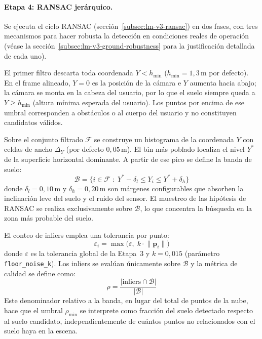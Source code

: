 \paragraph{Etapa 4: RANSAC jerárquico.}
Se ejecuta el ciclo RANSAC (sección~\ref{subsec:lm-v3-ransac}) en dos fases,
con tres mecanismos para hacer robusta la detección en condiciones reales de
operación (véase la sección~\ref{subsec:lm-v3-ground-robustness} para la
justificación detallada de cada uno).

El primer filtro descarta toda coordenada $Y < h_{\min}$ ($h_{\min} = 1{,}3\,\text{m}$
por defecto). En el frame alineado, $Y = 0$ es la posición de la cámara e $Y$
aumenta hacia abajo; la cámara se monta en la cabeza del usuario, por lo que
el suelo siempre queda a $Y \geq h_{\min}$ (altura mínima esperada del
usuario). Los puntos por encima de ese umbral corresponden a obstáculos o al
cuerpo del usuario y no constituyen candidatos válidos.

Sobre el conjunto filtrado $\mathcal{F}$ se construye un histograma de la coordenada
$Y$ con celdas de ancho $\Delta_Y$ (por defecto $0{,}05\,\text{m}$). El bin
más poblado localiza el nivel $Y^*$ de la superficie horizontal dominante.
A partir de ese pico se define la banda de suelo:
\begin{equation}
  \label{eq:floor-band}
  \mathcal{B} = \bigl\{i \in \mathcal{F} \;:\; Y^* - \delta_l \leq Y_i \leq Y^* + \delta_h\bigr\}
\end{equation}
donde $\delta_l = 0{,}10\,\text{m}$ y $\delta_h = 0{,}20\,\text{m}$ son márgenes
configurables que absorben la inclinación leve del suelo y el ruido del sensor.
El muestreo de las hipótesis de RANSAC se realiza exclusivamente sobre $\mathcal{B}$,
lo que concentra la búsqueda en la zona más probable del suelo.

El conteo de inliers emplea una tolerancia por punto:
\begin{equation}
  \label{eq:variable-tol}
  \varepsilon_i = \max\bigl(\varepsilon,\; k \cdot \lVert \mathbf{p}_i \rVert\bigr)
\end{equation}
donde $\varepsilon$ es la tolerancia global de la Etapa~3 y $k = 0{,}015$
(parámetro \texttt{floor\_noise\_k}). Los inliers se evalúan únicamente sobre $\mathcal{B}$
y la métrica de calidad se define como:
\begin{equation}
  \label{eq:relative-quality}
  \rho = \frac{|\text{inliers} \cap \mathcal{B}|}{|\mathcal{B}|}
\end{equation}
Este denominador relativo a la banda, en lugar del total de puntos de la nube,
hace que el umbral $\rho_{\min}$ se interprete como fracción del suelo
detectado respecto al suelo candidato, independientemente de cuántos puntos
no relacionados con el suelo haya en la escena.

